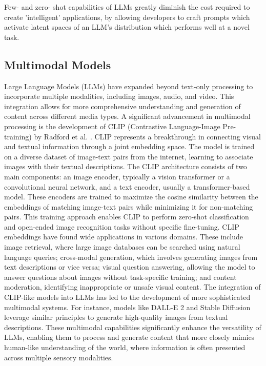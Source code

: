 \documentclass[a4paper, oneside]{discothesis}
\begin{document}
Few- and zero- shot capabilities of LLMs greatly diminish the cost required to create 'intelligent' applications, by allowing developers to craft prompts which activate latent spaces of an LLM's distribution which performs well at a novel task.

\subsection{Multimodal Models}
Large Language Models (LLMs) have expanded beyond text-only processing to incorporate multiple modalities, including images, audio, and video. This integration allows for more comprehensive understanding and generation of content across different media types. A significant advancement in multimodal processing is the development of CLIP (Contrastive Language-Image Pre-training) by Radford et al. \cite{radford2021learning}. CLIP represents a breakthrough in connecting visual and textual information through a joint embedding space. The model is trained on a diverse dataset of image-text pairs from the internet, learning to associate images with their textual descriptions.
The CLIP architecture consists of two main components: an image encoder, typically a vision transformer or a convolutional neural network, and a text encoder, usually a transformer-based model. These encoders are trained to maximize the cosine similarity between the embeddings of matching image-text pairs while minimizing it for non-matching pairs. This training approach enables CLIP to perform zero-shot classification and open-ended image recognition tasks without specific fine-tuning.
CLIP embeddings have found wide applications in various domains. These include image retrieval, where large image databases can be searched using natural language queries; cross-modal generation, which involves generating images from text descriptions or vice versa; visual question answering, allowing the model to answer questions about images without task-specific training; and content moderation, identifying inappropriate or unsafe visual content.
The integration of CLIP-like models into LLMs has led to the development of more sophisticated multimodal systems. For instance, models like DALL-E 2 \cite{ramesh2022hierarchical} and Stable Diffusion \cite{rombach2022high} leverage similar principles to generate high-quality images from textual descriptions. These multimodal capabilities significantly enhance the versatility of LLMs, enabling them to process and generate content that more closely mimics human-like understanding of the world, where information is often presented across multiple sensory modalities.
\end{document}

